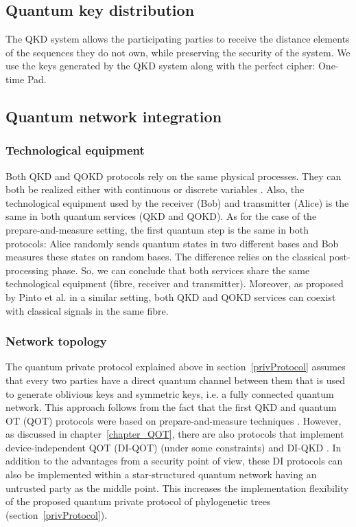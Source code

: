 \subsection{Quantum key distribution} 

The QKD system allows the participating parties to receive the distance elements of the sequences they do not own, while preserving the security of the system. We use the keys generated by the QKD system along with the perfect cipher: One-time Pad. %


\subsection{Quantum network integration}

\subsubsection{Technological equipment}

Both QKD and QOKD protocols rely on the same physical processes. They can both be realized either with continuous or discrete variables \cite{Pirandola2020,Silva2019,FGSPSW18, Lemus20}. Also, the technological equipment used by the receiver (Bob) and transmitter (Alice) is the same in both quantum services (QKD and QOKD). As for the case of the prepare-and-measure setting, the first quantum step is the same in both protocols: Alice randomly sends quantum states in two different bases and Bob measures these states on random bases. The difference relies on the classical post-processing phase. So, we can conclude that both services share the same technological equipment (fibre, receiver and transmitter). Moreover, as proposed by Pinto et al. \cite{Pinto2020} in a similar setting, both QKD and QOKD services can coexist with classical signals in the same fibre.

\subsubsection{Network topology}

The quantum private protocol explained above in section~\ref{privProtocol} assumes that every two parties have a direct quantum channel between them that is used to generate oblivious keys and symmetric keys, i.e. a fully connected quantum network. This approach follows from the fact that the first QKD and quantum OT (QOT) protocols were based on prepare-and-measure techniques \cite{BB84, BBCS91}. However, as discussed in chapter~\ref{chapter_QOT}, there are also protocols that implement device-independent QOT (DI-QOT) \cite{KW16, RW20} (under some constraints) and DI-QKD \cite{Pirandola2020}. In addition to the advantages from a security point of view, these DI protocols can also be implemented within a star-structured quantum network having an untrusted party as the middle point. This increases the implementation flexibility of the proposed quantum private protocol of phylogenetic trees (section~\ref{privProtocol}).

